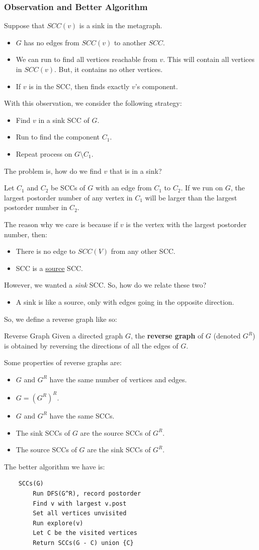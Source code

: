 \documentclass[letterpaper]{article}
\begin{document}
\subsubsection{Observation and Better Algorithm}
Suppose that $SCC(v)$ is a sink in the metagraph.
\begin{itemize}
    \item $G$ has no edges from $SCC(v)$ to another $SCC$. 
    \item We can run  to find all vertices reachable from $v$. This will contain all vertices in $SCC(v)$. But, it contains no other vertices. 
    \item If $v$ is in the SCC, then  finds exactly $v$'s component. 
\end{itemize}
With this observation, we consider the following strategy:
\begin{itemize}
    \item Find $v$ in a sink SCC of $G$. 
    \item Run  to find the component $C_1$.
    \item Repeat process on $G \setminus C_1$.
\end{itemize}
The problem is, how do we find $v$ that is in a sink?
\begin{proposition}
    Let $C_1$ and $C_2$ be SCCs of $G$ with an edge from $C_1$ to $C_2$. If we run  on $G$, the largest postorder number of any vertex in $C_1$ will be larger than the largest postorder number in $C_2$. 
\end{proposition}

The reason why we care is because if $v$ is the vertex with the largest postorder number, then: 
\begin{itemize}
    \item There is no edge to $SCC(V)$ from any other SCC. 
    \item SCC is a \underline{source} SCC.
\end{itemize}
However, we wanted a \emph{sink} SCC. So, how do we relate these two?
\begin{itemize}
    \item A sink is like a source, only with edges going in the opposite direction.
\end{itemize}
So, we define a reverse graph like so: 
\begin{definition}{Reverse Graph}{}
    Given a directed graph $G$, the \textbf{reverse graph} of $G$ (denoted $G^R$) is obtained by reversing the directions of all the edges of $G$.
\end{definition}
Some properties of reverse graphs are: 
\begin{itemize}
    \item $G$ and $G^R$ have the same number of vertices and edges. 
    \item $G = (G^R)^R$. 
    \item $G$ and $G^R$ have the same SCCs. 
    \item The sink SCCs of $G$ are the source SCCs of $G^R$. 
    \item The source SCCs of $G$ are the sink SCCs of $G^R$. 
\end{itemize}

The better algorithm we have is: 
\begin{verbatim}
    SCCs(G)
        Run DFS(G^R), record postorder 
        Find v with largest v.post 
        Set all vertices unvisited 
        Run explore(v)
        Let C be the visited vertices 
        Return SCCs(G - C) union {C}
\end{verbatim}
\end{document}
